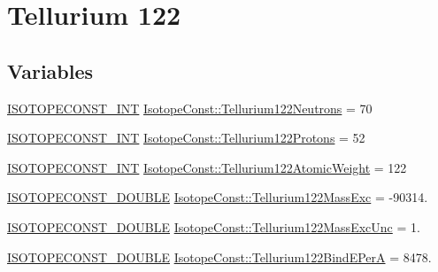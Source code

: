 \hypertarget{group___isotope_const-_tellurium-_te122}{}\section{Tellurium 122}
\label{group___isotope_const-_tellurium-_te122}
\subsection*{Variables}
\begin{DoxyCompactItemize}
\item 
\mbox{\hyperlink{group___isotope_const-_macros_ga5f18360b3e99483a35c32d789e62621c}{I\+S\+O\+T\+O\+P\+E\+C\+O\+N\+S\+T\+\_\+\+I\+NT}} \mbox{\hyperlink{group___isotope_const-_tellurium-_te122_ga6f6f742a8129b7a2cc0151881bc31325}{Isotope\+Const\+::\+Tellurium122\+Neutrons}} = 70
\item 
\mbox{\hyperlink{group___isotope_const-_macros_ga5f18360b3e99483a35c32d789e62621c}{I\+S\+O\+T\+O\+P\+E\+C\+O\+N\+S\+T\+\_\+\+I\+NT}} \mbox{\hyperlink{group___isotope_const-_tellurium-_te122_ga04e8f3876d841287a89580b248fa90e8}{Isotope\+Const\+::\+Tellurium122\+Protons}} = 52
\item 
\mbox{\hyperlink{group___isotope_const-_macros_ga5f18360b3e99483a35c32d789e62621c}{I\+S\+O\+T\+O\+P\+E\+C\+O\+N\+S\+T\+\_\+\+I\+NT}} \mbox{\hyperlink{group___isotope_const-_tellurium-_te122_ga1d44ab568306ae232658211d706b78d8}{Isotope\+Const\+::\+Tellurium122\+Atomic\+Weight}} = 122
\item 
\mbox{\hyperlink{group___isotope_const-_macros_ga8f45a7272ce02c0b4c65c44636ed719a}{I\+S\+O\+T\+O\+P\+E\+C\+O\+N\+S\+T\+\_\+\+D\+O\+U\+B\+LE}} \mbox{\hyperlink{group___isotope_const-_tellurium-_te122_ga54c60158bdf37e840daef14c87fa861a}{Isotope\+Const\+::\+Tellurium122\+Mass\+Exc}} = -\/90314.
\item 
\mbox{\hyperlink{group___isotope_const-_macros_ga8f45a7272ce02c0b4c65c44636ed719a}{I\+S\+O\+T\+O\+P\+E\+C\+O\+N\+S\+T\+\_\+\+D\+O\+U\+B\+LE}} \mbox{\hyperlink{group___isotope_const-_tellurium-_te122_gab4ace1bb1b44fc16a3288869a1b06df4}{Isotope\+Const\+::\+Tellurium122\+Mass\+Exc\+Unc}} = 1.
\item 
\mbox{\hyperlink{group___isotope_const-_macros_ga8f45a7272ce02c0b4c65c44636ed719a}{I\+S\+O\+T\+O\+P\+E\+C\+O\+N\+S\+T\+\_\+\+D\+O\+U\+B\+LE}} \mbox{\hyperlink{group___isotope_const-_tellurium-_te122_ga313c3f61ba627eb232ff41265837904b}{Isotope\+Const\+::\+Tellurium122\+Bind\+E\+PerA}} = 8478.
\item 

\end{DoxyCompactItemize}
